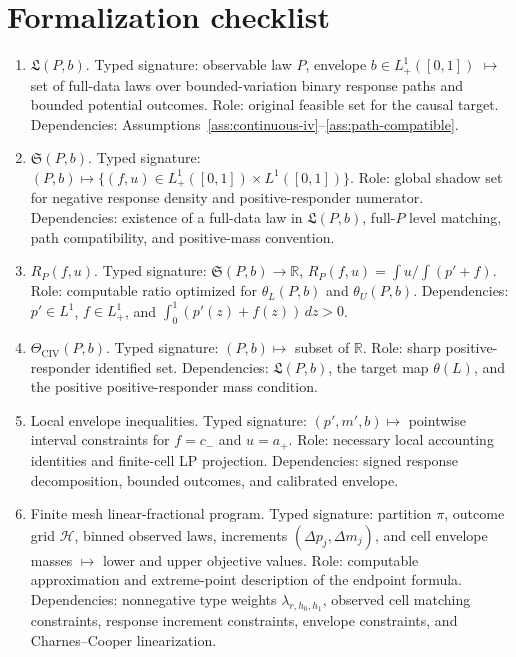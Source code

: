 \documentclass[11pt]{article}
\newcommand{\R}{\mathbb{R}}
\theoremstyle{definition}
\theoremstyle{plain}
\theoremstyle{remark}
\begin{document}
\section{Formalization checklist}
\begin{enumerate}[label=\arabic*.]
\item \(\mathfrak L(P,b)\).  Typed signature: observable law \(P\), envelope
\(b\in L^1_+([0,1])\) \(\mapsto\) set of full-data laws over bounded-variation
binary response paths and bounded potential outcomes.  Role: original feasible
set for the causal target.  Dependencies: Assumptions~\ref{ass:continuous-iv}--\ref{ass:path-compatible}.

\item \(\mathfrak S(P,b)\).  Typed signature:
\((P,b)\mapsto\{(f,u)\in L^1_+([0,1])\times L^1([0,1])\}\).  Role: global
shadow set for negative response density and positive-responder numerator.
Dependencies: existence of a full-data law in \(\mathfrak L(P,b)\), full-\(P\)
level matching, path compatibility, and positive-mass convention.

\item \(R_P(f,u)\).  Typed signature:
\(\mathfrak S(P,b)\to\R\), \(R_P(f,u)=\int u/\int(p'+f)\).  Role:
computable ratio optimized for \(\theta_L(P,b)\) and \(\theta_U(P,b)\).
Dependencies: \(p'\in L^1\), \(f\in L^1_+\), and
\(\int_0^1(p'(z)+f(z))\,dz>0\).

\item \(\Theta_{\mathrm{CIV}}(P,b)\).  Typed signature: \((P,b)\mapsto\)
subset of \(\R\).  Role: sharp positive-responder identified set.
Dependencies: \(\mathfrak L(P,b)\), the target map \(\theta(L)\), and the
positive positive-responder mass condition.

\item Local envelope inequalities.  Typed signature:
\((p',m',b)\mapsto\) pointwise interval constraints for \(f=c_-\) and
\(u=a_+\).  Role: necessary local accounting identities and finite-cell LP
projection.  Dependencies: signed response decomposition, bounded outcomes,
and calibrated envelope.

\item Finite mesh linear-fractional program.  Typed signature: partition
\(\pi\), outcome grid \(\mathcal H\), binned observed laws, increments
\((\Delta p_j,\Delta m_j)\), and cell envelope masses \(\mapsto\) lower and
upper objective values.  Role: computable approximation and extreme-point
description of the endpoint formula.  Dependencies: nonnegative type weights
\(\lambda_{r,h_0,h_1}\), observed cell matching constraints, response
increment constraints, envelope constraints, and Charnes--Cooper
linearization.


\end{enumerate}
\end{document}
